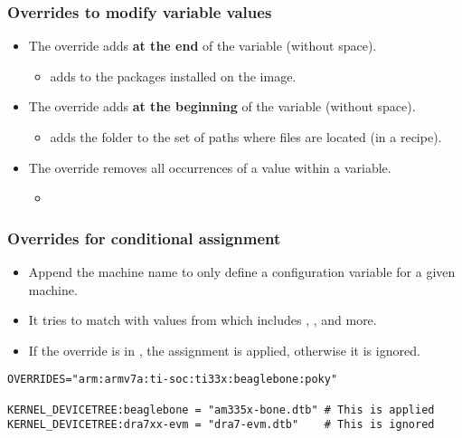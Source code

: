 \begin{frame}
  \frametitle{Overrides to modify variable values}
  \begin{itemize}
    \item The  override adds {\bf at the end} of the variable
      (without space).
      \begin{itemize}
        \item {} adds
           to the packages installed on the image.
      \end{itemize}
    \item The  override adds {\bf at the beginning} of the
      variable (without space).
      \begin{itemize}
        \item {}
          adds the folder to the set of paths where files are located
          (in a recipe).
      \end{itemize}
    \item The  override removes all occurrences of a value
      within a variable.
      \begin{itemize}
        \item {}
      \end{itemize}
  \end{itemize}
\end{frame}

\begin{frame}[fragile]
  \frametitle{Overrides for conditional assignment}
  \begin{itemize}
    \item Append the machine name to only define a configuration variable
      for a given machine.
    \item It tries to match with values from  which
      includes , , and more.
    \item If the override is in , the assignment is
      applied, otherwise it is ignored.
  \end{itemize}
  \begin{block}{}
    \begin{verbatim}
OVERRIDES="arm:armv7a:ti-soc:ti33x:beaglebone:poky"

KERNEL_DEVICETREE:beaglebone = "am335x-bone.dtb" # This is applied
KERNEL_DEVICETREE:dra7xx-evm = "dra7-evm.dtb"    # This is ignored
    \end{verbatim}
  \end{block}
\end{frame}

